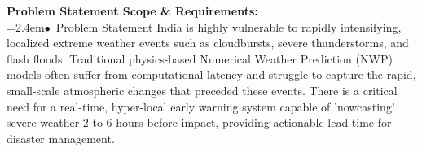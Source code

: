 \documentclass[10pt,a4paper]{article}
\begin{document}
\begin{tcolorbox}[pscard, title={"\textbf{SIH26077} \quad $\vert$ \quad AI-Driven Hyper-Local Early Warning System for Severe Weather Nowcasting}]
\textbf{\color{sihnavy}Problem Statement Scope \& Requirements:}\\[0.15cm]
\noindent\hspace*{1.2em}\hangindent=2.4em\textcolor{sihblue}{$\bullet$}~\small Problem Statement India is highly vulnerable to rapidly intensifying, localized extreme weather events such as cloudbursts, severe thunderstorms, and flash floods. Traditional physics-based Numerical Weather Prediction (NWP) models often suffer from computational latency and struggle to capture the rapid, small-scale atmospheric changes that preceded these events. There is a critical need for a real-time, hyper-local early warning system capable of 'nowcasting' severe weather 2 to 6 hours before impact, providing actionable lead time for disaster management.\par\vspace{0.05cm}

\end{tcolorbox}
\end{document}
